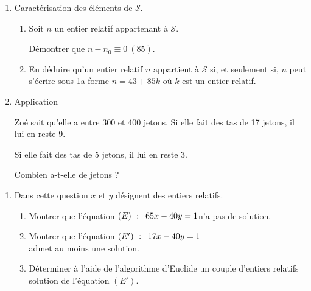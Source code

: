 \begin{colonne*exercice}
\begin{exercice}
\begin{enumerate}
\begin{enumerate}
\item On pose $n_0=3\times17u+9\times5v$.

Démontrer que $n_0$ appartient à $\mathscr{S}$.

\item Donner un exemple d'entier $n_0$ appartenant à $\mathscr{S}$.
\end{enumerate}

\item Caractérisation des éléments de $\mathscr{S}$.
\begin{enumerate}
\item Soit $n$ un entier relatif appartenant à $\mathscr{S}$.
 
Démontrer que $n-n_0\equiv0~(85)$.

\item En déduire qu'un entier relatif $n$ appartient à $\mathscr{S}$
  si, et seulement si, $n$ peut s'écrire sous 1a forme $n=43+85k$ où
  $k$ est un entier relatif.
\end{enumerate}

\item Application

Zoé sait qu'elle a entre 300 et 400 jetons. Si elle fait des tas de 17
jetons, il lui en reste 9. 

Si elle fait des tas de 5 jetons, il lui en reste 3.

Combien a-t-elle de jetons ?
\end{enumerate}
\end{exercice}

\columnbreak


\begin{exercice}
\begin{enumerate}
\item Dans cette question $x$ et $y$ désignent des entiers relatifs.
\begin{enumerate}
\item Montrer que l'équation $(E)~:\enskip 65x - 40y = 1$\enskip n'a pas de solution.\medskip

\item Montrer que l'équation $(E')~:\enskip 17x - 40y = 1$\\ admet au moins une  solution.\medskip

\item Déterminer à l'aide de l'algorithme d'Euclide un couple d'entiers relatifs solution de l'équation $\left(E'\right)$.
	

\end{enumerate}
\end{enumerate}
\end{exercice}
\end{colonne*exercice}
